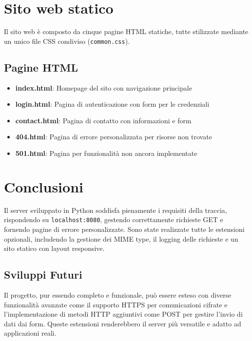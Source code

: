 \documentclass[a4paper,12pt]{report}
\begin{document}
\chapter{Sito web statico}

Il sito web è composto da cinque pagine HTML statiche, tutte stilizzate mediante un unico file CSS condiviso (\texttt{common.css}).

\section{Pagine HTML}

\begin{itemize}
    \item \textbf{index.html}: Homepage del sito con navigazione principale
    \item \textbf{login.html}: Pagina di autenticazione con form per le credenziali
    \item \textbf{contact.html}: Pagina di contatto con informazioni e form
    \item \textbf{404.html}: Pagina di errore personalizzata per risorse non trovate
    \item \textbf{501.html}: Pagina per funzionalità non ancora implementate
\end{itemize}

\chapter{Conclusioni}

Il server sviluppato in Python soddisfa pienamente i requisiti della traccia, rispondendo su \texttt{localhost:8080}, gestendo correttamente richieste GET e fornendo pagine di errore personalizzate. 
Sono state realizzate tutte le estensioni opzionali, includendo la gestione dei MIME type, il logging delle richieste e un sito statico con layout responsive. 

\section{Sviluppi Futuri}

Il progetto, pur essendo completo e funzionale, può essere esteso con diverse funzionalità avanzate come il supporto HTTPS per comunicazioni cifrate e l'implementazione di metodi HTTP aggiuntivi come POST per gestire l'invio di dati dai form. Queste estensioni renderebbero il server più versatile e adatto ad applicazioni reali.

\appendix
\end{document}
